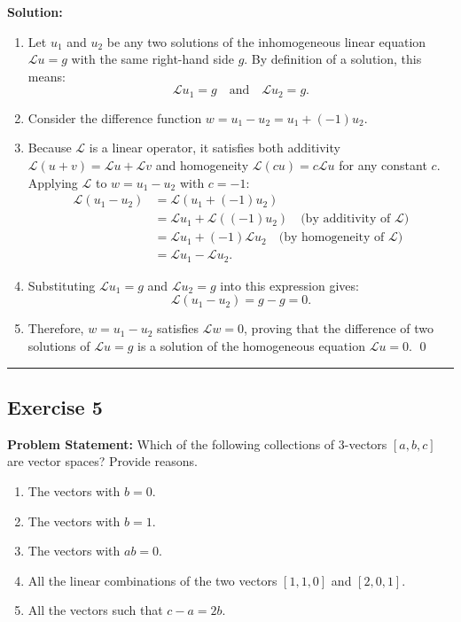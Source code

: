 \documentclass[11pt,a4paper]{article}
\begin{document}
\textbf{Solution:}
\begin{enumerate}
    \item Let $u_1$ and $u_2$ be any two solutions of the inhomogeneous linear equation $\mathcal{L}u = g$ with the same right-hand side $g$. By definition of a solution, this means:
    \[
        \mathcal{L}u_1 = g \quad \text{and} \quad \mathcal{L}u_2 = g.
    \]
    \item Consider the difference function $w = u_1 - u_2 = u_1 + (-1)u_2$.
    \item Because $\mathcal{L}$ is a linear operator, it satisfies both additivity $\mathcal{L}(u + v) = \mathcal{L}u + \mathcal{L}v$ and homogeneity $\mathcal{L}(cu) = c\mathcal{L}u$ for any constant $c$. Applying $\mathcal{L}$ to $w = u_1 - u_2$ with $c = -1$:
    \begin{align*}
        \mathcal{L}(u_1 - u_2) &= \mathcal{L}(u_1 + (-1)u_2) \\
        &= \mathcal{L}u_1 + \mathcal{L}((-1)u_2) \quad \text{(by additivity of } \mathcal{L}\text{)} \\
        &= \mathcal{L}u_1 + (-1)\mathcal{L}u_2 \quad \text{(by homogeneity of } \mathcal{L}\text{)} \\
        &= \mathcal{L}u_1 - \mathcal{L}u_2.
    \end{align*}
    \item Substituting $\mathcal{L}u_1 = g$ and $\mathcal{L}u_2 = g$ into this expression gives:
    \[
        \mathcal{L}(u_1 - u_2) = g - g = 0.
    \]
    \item Therefore, $w = u_1 - u_2$ satisfies $\mathcal{L}w = 0$, proving that the difference of two solutions of $\mathcal{L}u = g$ is a solution of the homogeneous equation $\mathcal{L}u = 0$. \qed
\end{enumerate}

\bigskip
\hrule
\bigskip

\subsection*{Exercise 5}
\textbf{Problem Statement:} Which of the following collections of 3-vectors $[a, b, c]$ are vector spaces? Provide reasons.
\begin{enumerate}[label=(\alph*)]
    \item The vectors with $b = 0$.
    \item The vectors with $b = 1$.
    \item The vectors with $ab = 0$.
    \item All the linear combinations of the two vectors $[1, 1, 0]$ and $[2, 0, 1]$.
    \item All the vectors such that $c - a = 2b$.
\end{enumerate}
\end{document}
